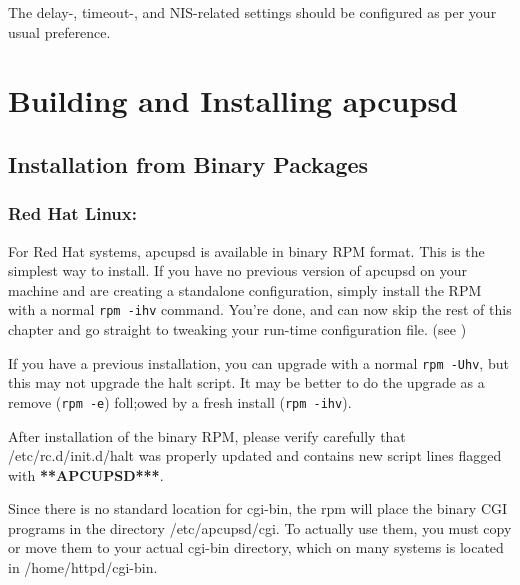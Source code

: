 The delay-, timeout-, and NIS-related settings should be configured as per
your usual preference. 

\label{Building-and-Installing-apcupsd}

\section*{Building and Installing apcupsd}

\label{index-Building-18}
\label{index-Installing-19}

\label{Installation-from-Binary-Packages}

\subsection*{Installation from Binary Packages}

\label{Red-Hat-Linux}

\subsubsection*{Red Hat Linux:}

\label{index-Installing_002c-Red-Hat-20}
For Red Hat systems, apcupsd is available in binary RPM format.  This is the
simplest way to install. If you have no previous version of apcupsd on your
machine and are creating a standalone configuration, simply install the RPM
with a normal {\tt rpm -ihv} command. You're done, and can now skip the rest
of this chapter and go straight to tweaking your run-time configuration file.
(see 
)  

If you have a previous installation, you can upgrade with a normal {\tt rpm
-Uhv}, but this may not upgrade the halt script. It may be better to do the
upgrade as a remove ({\tt rpm -e}) foll;owed by a fresh install ({\tt rpm
-ihv}).  

After installation of the binary RPM, please verify carefully that
/etc/rc.d/init.d/halt was properly updated and contains new script lines
flagged with {\bf ***APCUPSD***}.  

Since there is no standard location for cgi-bin, the rpm will place the binary
CGI programs in the directory /etc/apcupsd/cgi. To actually use them, you must
copy or move them to your actual cgi-bin directory, which on many systems is
located in /home/httpd/cgi-bin. 

